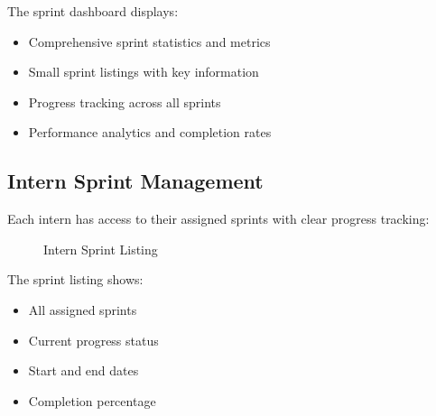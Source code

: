 The sprint dashboard displays:
\begin{itemize}
    \item Comprehensive sprint statistics and metrics
    \item Small sprint listings with key information
    \item Progress tracking across all sprints
    \item Performance analytics and completion rates
\end{itemize}

\subsection{Intern Sprint Management}
\noindent
Each intern has access to their assigned sprints with clear progress tracking:

\begin{figure}[H]
    \centering
    \caption{Intern Sprint Listing}
    \label{fig:sprint_listing}
\end{figure}

The sprint listing shows:
\begin{itemize}
    \item All assigned sprints
    \item Current progress status
    \item Start and end dates
    \item Completion percentage
\end{itemize}

